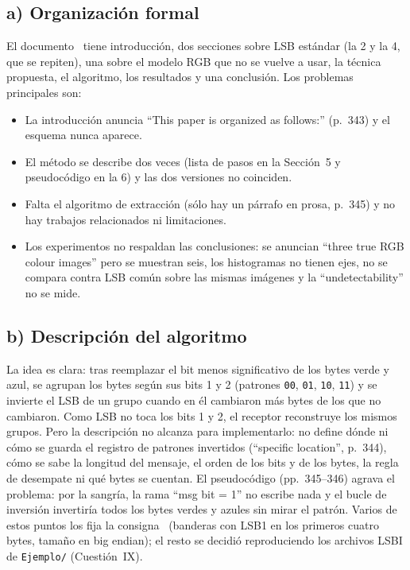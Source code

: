 
\subsection{a) Organización formal}

El documento~\cite{majeed2015} tiene introducción, dos secciones sobre LSB estándar (la 2 y la 4, que se repiten), una sobre el
modelo RGB que no se vuelve a usar, la técnica propuesta, el algoritmo, los resultados y una conclusión. Los problemas principales son:
\begin{itemize}
\item La introducción anuncia ``This paper is organized as follows:'' (p.~343) y el esquema nunca aparece.
\item El método se describe dos veces (lista de pasos en la Sección~5 y pseudocódigo en la 6) y las dos versiones no coinciden.
\item Falta el algoritmo de extracción (sólo hay un párrafo en prosa, p.~345) y no hay trabajos relacionados ni limitaciones.
\item Los experimentos no respaldan las conclusiones: se anuncian ``three true RGB colour images'' pero se muestran seis, los histogramas
no tienen ejes, no se compara contra LSB común sobre las mismas imágenes y la ``undetectability'' no se mide.
\end{itemize}

\subsection{b) Descripción del algoritmo}

La idea es clara: tras reemplazar el bit menos significativo de los bytes verde y azul, se agrupan los bytes según sus bits 1 y 2
(patrones \texttt{00}, \texttt{01}, \texttt{10}, \texttt{11}) y se invierte el LSB de un grupo cuando en él cambiaron más bytes de los que no
cambiaron. Como LSB no toca los bits 1 y 2, el receptor reconstruye los mismos grupos. Pero la descripción no alcanza para implementarlo:
no define dónde ni cómo se guarda el registro de patrones invertidos (``specific location'', p.~344), cómo se sabe la longitud del mensaje,
el orden de los bits y de los bytes, la regla de desempate ni qué bytes se cuentan. El pseudocódigo (pp.~345--346) agrava el problema:
por la sangría, la rama ``msg bit = 1'' no escribe nada y el bucle de inversión invertiría todos los bytes verdes y azules sin mirar el patrón.
Varios de estos puntos los fija la consigna~\cite{catedra2026} (banderas con LSB1 en los primeros cuatro bytes, tamaño en big endian);
el resto se decidió reproduciendo los archivos LSBI de \texttt{Ejemplo/} (Cuestión~IX).

